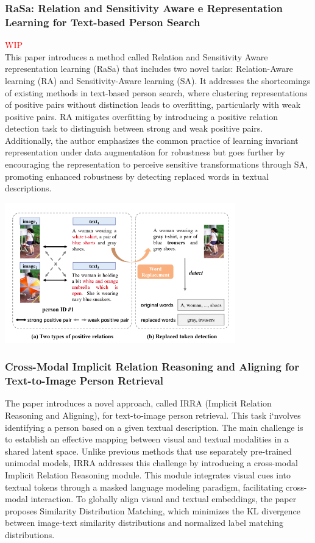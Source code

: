 \subsubsection{RaSa: Relation and Sensitivity Aware e Representation Learning for Text-based Person Search}
\textcolor{red}{WIP}\\
This paper introduces a method called Relation and Sensitivity Aware representation learning (RaSa) that includes two novel tasks: Relation-Aware learning (RA) and Sensitivity-Aware learning (SA). It addresses the shortcomings of existing methods in text-based person search, where clustering representations of positive pairs without distinction leads to overfitting, particularly with weak positive pairs. RA mitigates overfitting by introducing a positive relation detection task to distinguish between strong and weak positive pairs. Additionally, the author emphasizes the common practice of learning invariant representation under data augmentation for robustness but goes further by encouraging the representation to perceive sensitive transformations through SA, promoting enhanced robustness by detecting replaced words in textual descriptions.

\includegraphics[width=10cm]{img/rasa.png}


\subsubsection{Cross-Modal Implicit Relation Reasoning and Aligning for Text-to-Image Person Retrieval}
The paper introduces a novel approach, called IRRA (Implicit Relation Reasoning and Aligning), for text-to-image person retrieval. This task i`nvolves identifying a person based on a given textual description. The main challenge is to establish an effective mapping between visual and textual modalities in a shared latent space. Unlike previous methods that use separately pre-trained unimodal models, IRRA addresses this challenge by introducing a cross-modal Implicit Relation Reasoning module. This module integrates visual cues into textual tokens through a masked language modeling paradigm, facilitating cross-modal interaction. To globally align visual and textual embeddings, the paper proposes Similarity Distribution Matching, which minimizes the KL divergence between image-text similarity distributions and normalized label matching distributions. 

